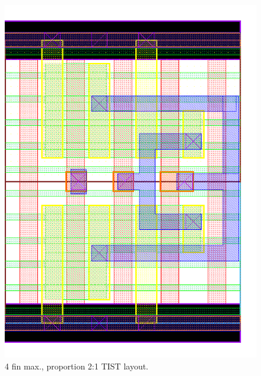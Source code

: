 \documentclass[pgmicro,mestrado,english]{iiufrgs}
\begin{document}
\begin{figure}[H]
\centering
\includegraphics[width=\textwidth,height=\textheight,keepaspectratio]{TIST4F2F.png}
\caption{4 fin max., proportion 2:1 TIST layout.}
\label{fig:TIST3F}
\end{figure}
\end{document}
